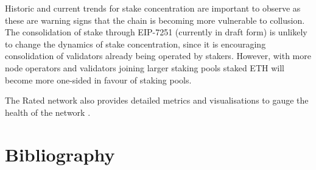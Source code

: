 \documentclass[UTF8]{article}
\begin{document}
Historic and current trends for stake concentration are important to observe as these are warning signs that the chain is becoming more vulnerable to collusion. The consolidation of stake through EIP-7251 (currently in draft form) \cite{Neuder2023c} is unlikely to change the dynamics of stake concentration, since it is encouraging consolidation of validators already being operated by stakers. However, with more node operators and validators joining larger staking pools staked ETH will become more one-sided in favour of staking pools. 

The Rated network also provides detailed metrics and visualisations to gauge the health of the network \cite{Rated2023a}. 


\section{Bibliography}
\nocite{*}


\end{document}
